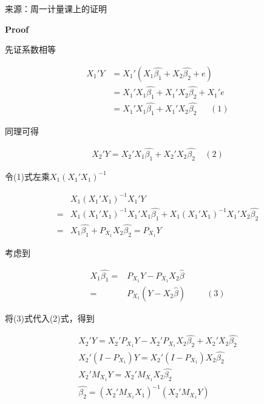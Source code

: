 \documentclass{article}
\begin{document}
\begin{enumerate}
        来源：周一计量课上的证明
        
        \textbf{Proof}
        
        先证系数相等
        
        $$
          \begin{aligned}
            X_1'Y & = X_1'(X_1\widehat{\beta_1}+X_2\widehat{\beta_2}+e) \\
            & = X_1'X_1\widehat{\beta_1}+X_1'X_2\widehat{\beta_2}+X_1'e \\
            & = X_1'X_1\widehat{\beta_1}+X_1'X_2\widehat{\beta_2} \ \ \ \ \ \ \ (1)
          \end{aligned}
        $$
        
        同理可得
        
        $$
          \begin{aligned}
            X_2'Y = X_2'X_1\widehat{\beta_1} + X_2'X_2\widehat{\beta_2} \ \ \ \ \ (2)
          \end{aligned}
        $$
        
        令(1)式左乘$X_1(X_1'X_1)^{-1}$
        
        $$
          \begin{aligned}
            & X_1(X_1'X_1)^{-1}X_1'Y \\
            = & X_1(X_1'X_1)^{-1}X_1'X_1\widehat{\beta_1} + X_1(X_1'X_1)^{-1}X_1'X_2\widehat{\beta_2} \\
            = & X_1\widehat{\beta_1}+P_{X_1}X_2\widehat{\beta_2} = P_{X_1}Y
          \end{aligned}
        $$
        
        考虑到
        
        $$
          \begin{aligned}
            X_1\widehat{\beta_1} = & P_{X_1}Y - P_{X_1}X_2\widehat{\beta} \\
            = & P_{X_1}(Y-X_2\widehat{\beta}) \ \ \ \ \ \ \ \ \ \ \ (3)
          \end{aligned}
        $$
        
        将(3)式代入(2)式，得到
        
        $$
          \begin{aligned}
            X_2'Y = X_2'P_{X_1}Y - X_2'P_{X_1}X_2\widehat{\beta_2}+X_2'X_2\widehat{\beta_2} \\
            X_2'(I-P_{X_1})Y = X_2'(I-P_{X_1})X_2\widehat{\beta_2} \\
            X_2'M_{X_1}Y = X_2'M_{X_1}X_2\widehat{\beta_2} \\
            \widehat{\beta_2} = (X_2'M_{X_1}X_1)^{-1}(X_2'M_{X_1}Y)
          \end{aligned}
        $$
        

\end{enumerate}
\end{document}
